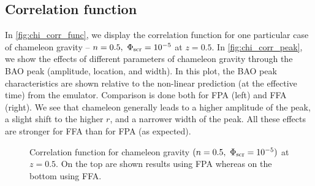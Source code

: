 \subsection{Correlation function}
In \autoref{fig:chi_corr_func}, we display the correlation function for one particular case of chameleon gravity -- $n=0.5,\ \Phi_{\text{\scriptsize scr}}=10^{-5}$ at $z=0.5$. In \autoref{fig:chi_corr_peak}, we show the effects of different parameters of chameleon gravity through the BAO peak (amplitude, location, and width). In this plot, the BAO peak characteristics are shown relative to the non-linear prediction (at the effective time) from the emulator. Comparison is done both for FPA (left) and FFA (right). We see that chameleon generally leads to a higher amplitude of the peak, a slight shift to the higher $r$, and a narrower width of the peak. All these effects are stronger for FFA than for FPA (as expected).

\begin{figure*}
\centering
	\begin{subfigure}{1.1\textwidth}
		\chileft
	\end{subfigure}
	\begin{subfigure}{0.9\textwidth}
		\centering
	\end{subfigure}
	\begin{subfigure}{0.9\textwidth}
		\centering
	\end{subfigure}
	\caption{Correlation function for chameleon gravity $(n=0.5,\ \Phi_{\text{\scriptsize scr}}=10^{-5})$ at $z=0.5$. On the top are shown results using FPA whereas on the bottom using FFA.}
	\label{fig:chi_corr_func}
\end{figure*}

